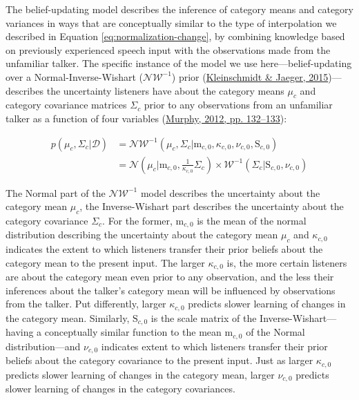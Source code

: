 \documentclass[
  11pt,
  man,floatsintext]{apa6}
\begin{document}
The belief-updating model describes the inference of category means and category variances in ways that are conceptually similar to the type of interpolation we described in Equation \eqref{eq:normalization-change}, by combining knowledge based on previously experienced speech input with the observations made from the unfamiliar talker. The specific instance of the model we use here---belief-updating over a Normal-Inverse-Wishart (\(\mathcal{NW^{-1}}\)) prior (\protect\hyperlink{ref-kleinschmidt-jaeger2015}{Kleinschmidt \& Jaeger, 2015})---describes the uncertainty listeners have about the category means \(\mu_c\) and category covariance matrices \(\Sigma_c\) prior to any observations from an unfamiliar talker as a function of four variables (\protect\hyperlink{ref-murphy2012}{Murphy, 2012, pp. 132--133}):

\begin{equation}\label{eq:niw-updating}
\begin{split}
p\left( \mu_c, \Sigma_c | \mathcal{D} \right) & = \mathcal{NW}^{-1} \left( \mu_c, \Sigma_c | \mathrm{m}_{c,0}, \kappa_{c,0}, \nu_{c,0}, \mathrm{S}_{c,0} \right) \\
& = \mathcal{N}\left( \mu_c | \mathrm{m}_{c,0}, \frac{1}{\kappa_{c,0}} \Sigma_{c} \right) \times \mathcal{W}^{-1}\left( \Sigma_c | \mathrm{S}_{c,0}, \nu_{c,0} \right)
\end{split}
\end{equation}

The Normal part of the \(\mathcal{NW^{-1}}\) model describes the uncertainty about the category mean \(\mu_c\), the Inverse-Wishart part describes the uncertainty about the category covariance \(\Sigma_c\). For the former, \(\mathrm{m}_{c,0}\) is the mean of the normal distribution describing the uncertainty about the category mean \(\mu_c\) and \(\kappa_{c,0}\) indicates the extent to which listeners transfer their prior beliefs about the category mean to the present input. The larger \(\kappa_{c,0}\) is, the more certain listeners are about the category mean even prior to any observation, and the less their inferences about the talker's category mean will be influenced by observations from the talker. Put differently, larger \(\kappa_{c,0}\) predicts slower learning of changes in the category mean. Similarly, \(\mathrm{S}_{c,0}\) is the scale matrix of the Inverse-Wishart---having a conceptually similar function to the mean \(\mathrm{m}_{c,0}\) of the Normal distribution---and \(\nu_{c,0}\) indicates extent to which listeners transfer their prior beliefs about the category covariance to the present input. Just as larger \(\kappa_{c,0}\) predicts slower learning of changes in the category mean, larger \(\nu_{c,0}\) predicts slower learning of changes in the category covariances.
\end{document}
